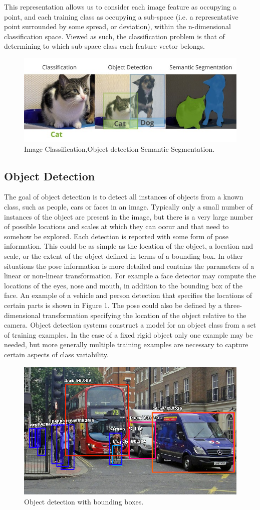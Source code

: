  This representation allows us to consider each image feature as occupying a point, and each training class as occupying a sub-space (i.e. a representative point surrounded by some spread, or deviation), within the n-dimensional classification space. Viewed as such, the classification problem is that of determining to which sub-space class each feature vector belongs.
\begin{figure}
  \centering
  \includegraphics[width=0.7\linewidth]{images/classification_detection_segmentaion_comparisons.jpeg}
   \caption{Image Classification,Object detection Semantic Segmentation.}
\end{figure}
\subsection{Object Detection}
 The goal of object detection is to detect all instances of objects from a known class, such as people, cars or faces in an image. Typically only a small number of instances of the object are present in the image, but there is a very large number of possible locations and scales at which they can occur and that need to somehow be explored.
Each detection is reported with some form of pose information. This could be as simple as the location of the object, a location and scale, or the extent of the object defined in terms of a bounding box. In other situations the pose information is more detailed and contains the parameters of a linear or non-linear transformation. For example a face detector may compute the locations of the
eyes, nose and mouth, in addition to the bounding box of the face. An example of a vehicle and person detection that specifies the locations of certain parts is shown in Figure 1. The pose could also be defined by a three-dimensional transformation specifying the location of the object relative to the camera.
Object detection systems construct a model for an object class from a set of
training examples. In the case of a fixed rigid object only one example may be
needed, but more generally multiple training examples are necessary to capture
certain aspects of class variability.
\begin{figure}
  \centering
  \includegraphics[width=0.5\linewidth]{images/object_det.jpeg}
   \caption{Object detection with bounding boxes.}
\end{figure}

